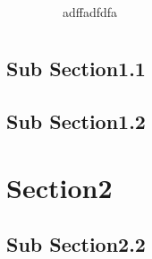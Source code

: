 \documentclass{mycv}
\begin{document}

 \\
{\color{magenta!80}\faMobile}\ \mobile \ \ \ \faEnvelope\ \email \ \ \  \faLinkedin\ adffadfdfa
\section{\name}
\subsection{Sub Section1.1}
\subsection{Sub Section1.2}
\section{Section2}
\subsection{Sub Section2.2}
\lipsum[1]

\ttfamily\scshape\lipsum[2]

\textcolor{red}{\ttfamily\scshape\lipsum[2]}
\end{document}
